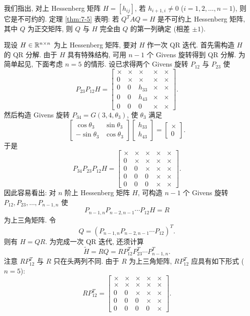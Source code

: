 我们指出, 对上 Hessenberg 矩阵 $H=[h_{ij}]$, 若 $h_{i+1,i}\neq0$ ($i=1,2,\ldots,n-1$), 则它是不可约的. 定理 \ref{thm:7-5} 表明: 若 $Q^TAQ=H$ 是不可约上 Hessenberg 矩阵, 其中 $Q$ 为正交矩阵, 则 $Q$ 与 $H$ 完全由 $Q$ 的第一列确定 (相差 $\pm1$).

现设 $H\in\mathbb{R}^{n\times n}$ 为上 Hessenberg 矩阵, 要对 $H$ 作一次 QR 迭代. 首先需构造 $H$ 的 QR 分解. 由于 $H$ 具有特殊结构, 可用 $n-1$ 个 Givens 旋转得到 QR 分解. 为简单起见, 下面考虑 $n=5$ 的情形. 设已求得两个 Givens 旋转 $P_{12}$ 与 $P_{23}$ 使
\[
  P_{23}P_{12}H=\begin{bmatrix}
    \times & \times & \times & \times & \times\\
    0 & \times & \times & \times & \times\\
    0 & 0 & h_{33} & \times & \times\\
    0 & 0 & h_{43} & \times & \times\\
    0 & 0 & 0 & \times & \times
  \end{bmatrix}.
\]
然后构造 Givens 旋转 $P_{34}=G(3,4,\theta_3)$, 使 $\theta_3$ 满足
\[
  \begin{bmatrix}
    \cos\theta_3 & \sin\theta_3\\
    -\sin\theta_3 & \cos\theta_3
  \end{bmatrix}
  \begin{bmatrix}
    h_{33}\\ h_{43}
  \end{bmatrix}
  =\begin{bmatrix}
    \times\\ 0
  \end{bmatrix}.
\]
于是
\[
  P_{34}P_{23}P_{12}H=\begin{bmatrix}
    \times & \times & \times & \times & \times\\
    0 & \times & \times & \times & \times\\
    0 & 0 & \times & \times & \times\\
    0 & 0 & 0 & \times & \times\\
    0 & 0 & 0 & \times & \times
  \end{bmatrix}.
\]
因此容易看出: 对 $n$ 阶上 Hessenberg 矩阵 $H$, 可构造 $n-1$ 个 Givens 旋转 $P_{12},P_{23},\ldots,P_{n-1,n}$ 使
\[
  P_{n-1,n}P_{n-2,n-1}\cdots P_{12}H=R
\]
为上三角矩阵. 令
\[
  Q=(P_{n-1,n}P_{n-2,n-1}\cdots P_{12})^T.
\]
则有 $H=QR$. 为完成一次 QR 迭代, 还须计算
\[
  \widetilde{H}=RQ=RP_{12}^TP_{23}^T\cdots P_{n-1,n}^T.
\]
注意 $RP_{12}^T$ 与 $R$ 只在头两列不同. 由于 $R$ 为上三角矩阵, $RP_{12}^T$ 应具有如下形式 ($n=5$):
\[
  RP_{12}^T=\begin{bmatrix}
    \times & \times & \times & \times & \times\\
    \times & \times & \times & \times & \times\\
    0 & 0 & \times & \times & \times\\
    0 & 0 & 0 & \times & \times\\
    0 & 0 & 0 & 0 & \times
  \end{bmatrix}.
\]
